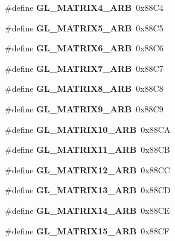 \begin{DoxyCompactItemize}
\item 
\#define {\bfseries G\+L\+\_\+\+M\+A\+T\+R\+I\+X4\+\_\+\+A\+R\+B}~0x88\+C4\label{_s_d_l__opengl_8h_a2c59139e6da233f8f2ee077c0abc8a92}

\item 
\#define {\bfseries G\+L\+\_\+\+M\+A\+T\+R\+I\+X5\+\_\+\+A\+R\+B}~0x88\+C5\label{_s_d_l__opengl_8h_a4b2aebcc94af17eefb54afa196bfca5c}

\item 
\#define {\bfseries G\+L\+\_\+\+M\+A\+T\+R\+I\+X6\+\_\+\+A\+R\+B}~0x88\+C6\label{_s_d_l__opengl_8h_a8e7627f16215a0b846717d50ac4163bb}

\item 
\#define {\bfseries G\+L\+\_\+\+M\+A\+T\+R\+I\+X7\+\_\+\+A\+R\+B}~0x88\+C7\label{_s_d_l__opengl_8h_a3ac93e85f9b5ce27b9b8139334ecac04}

\item 
\#define {\bfseries G\+L\+\_\+\+M\+A\+T\+R\+I\+X8\+\_\+\+A\+R\+B}~0x88\+C8\label{_s_d_l__opengl_8h_aee46d5f200261d1b9891588bc2823e91}

\item 
\#define {\bfseries G\+L\+\_\+\+M\+A\+T\+R\+I\+X9\+\_\+\+A\+R\+B}~0x88\+C9\label{_s_d_l__opengl_8h_a868c6f96e2f9dfae856a3a9c035e212f}

\item 
\#define {\bfseries G\+L\+\_\+\+M\+A\+T\+R\+I\+X10\+\_\+\+A\+R\+B}~0x88\+C\+A\label{_s_d_l__opengl_8h_a0d959d4ffe6cebd4a8df2e6983b151d6}

\item 
\#define {\bfseries G\+L\+\_\+\+M\+A\+T\+R\+I\+X11\+\_\+\+A\+R\+B}~0x88\+C\+B\label{_s_d_l__opengl_8h_aadfdd559663b98722fdd0ccb754b0590}

\item 
\#define {\bfseries G\+L\+\_\+\+M\+A\+T\+R\+I\+X12\+\_\+\+A\+R\+B}~0x88\+C\+C\label{_s_d_l__opengl_8h_ab3c107e119bc2f67624f3e1b02f3a34e}

\item 
\#define {\bfseries G\+L\+\_\+\+M\+A\+T\+R\+I\+X13\+\_\+\+A\+R\+B}~0x88\+C\+D\label{_s_d_l__opengl_8h_a4f758ad7ec574223a5adc8c5bd2807ec}

\item 
\#define {\bfseries G\+L\+\_\+\+M\+A\+T\+R\+I\+X14\+\_\+\+A\+R\+B}~0x88\+C\+E\label{_s_d_l__opengl_8h_ac0b5e16e244a26912f99a65d4edb5c13}

\item 
\#define {\bfseries G\+L\+\_\+\+M\+A\+T\+R\+I\+X15\+\_\+\+A\+R\+B}~0x88\+C\+F\label{_s_d_l__opengl_8h_a6da09adc9ac51bbab0a14c7846d56992}


\end{DoxyCompactItemize}

